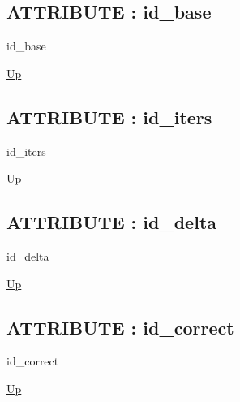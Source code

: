 \par
\par
\subsection*{ATTRIBUTE : id\_base}
\hypertarget{ecldoc:logisticregression.constants.id_base}{}
\begin{minipage}[t]{\textwidth}
\begin{flushleft}
 id\_base 
\end{flushleft}
\end{minipage}
\hyperlink{ecldoc:LogisticRegression.Constants}{Up}

\par
\par
\subsection*{ATTRIBUTE : id\_iters}
\hypertarget{ecldoc:logisticregression.constants.id_iters}{}
\begin{minipage}[t]{\textwidth}
\begin{flushleft}
 id\_iters 
\end{flushleft}
\end{minipage}
\hyperlink{ecldoc:LogisticRegression.Constants}{Up}

\par
\par
\subsection*{ATTRIBUTE : id\_delta}
\hypertarget{ecldoc:logisticregression.constants.id_delta}{}
\begin{minipage}[t]{\textwidth}
\begin{flushleft}
 id\_delta 
\end{flushleft}
\end{minipage}
\hyperlink{ecldoc:LogisticRegression.Constants}{Up}

\par
\par
\subsection*{ATTRIBUTE : id\_correct}
\hypertarget{ecldoc:logisticregression.constants.id_correct}{}
\begin{minipage}[t]{\textwidth}
\begin{flushleft}
 id\_correct 
\end{flushleft}
\end{minipage}
\hyperlink{ecldoc:LogisticRegression.Constants}{Up}

